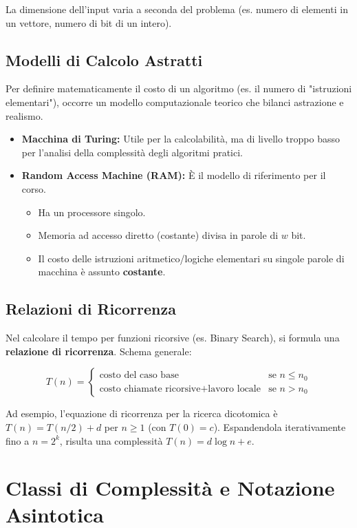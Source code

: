 \documentclass[12pt, a4paper]{article}
\begin{document}
La dimensione dell'input varia a seconda del problema (es. numero di elementi in un vettore, numero di bit di un intero).

\subsection{Modelli di Calcolo Astratti}
Per definire matematicamente il costo di un algoritmo (es. il numero di "istruzioni elementari"), occorre un modello computazionale teorico che bilanci astrazione e realismo.
\begin{itemize}
\item \textbf{Macchina di Turing:} Utile per la calcolabilità, ma di livello troppo basso per l'analisi della complessità degli algoritmi pratici.
\item \textbf{Random Access Machine (RAM):} È il modello di riferimento per il corso.
\begin{itemize}
\item Ha un processore singolo.
\item Memoria ad accesso diretto (costante) divisa in parole di $w$ bit.
\item Il costo delle istruzioni aritmetico/logiche elementari su singole parole di macchina è assunto \textbf{costante}.
\end{itemize}
\end{itemize}

\subsection{Relazioni di Ricorrenza}
Nel calcolare il tempo per funzioni ricorsive (es. Binary Search), si formula una \textbf{relazione di ricorrenza}.
Schema generale:


$$T(n) = \begin{cases} \text{costo del caso base} & \text{se } n \le n_0 \\ \text{costo chiamate ricorsive} + \text{lavoro locale} & \text{se } n > n_0 \end{cases}$$

Ad esempio, l'equazione di ricorrenza per la ricerca dicotomica è $T(n) = T(n/2) + d$ per $n \ge 1$ (con $T(0) = c$). Espandendola iterativamente fino a $n = 2^k$, risulta una complessità $T(n) = d \log n + e$.

\newpage

\section{Classi di Complessità e Notazione Asintotica}
\end{document}
